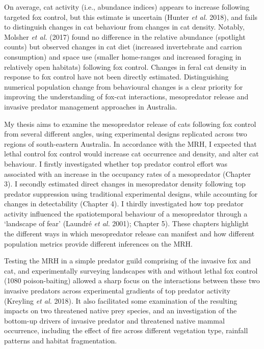 \documentclass[11pt,a4paper,titlepage,twoside,openright]{style/unimelbthesis}
\begin{document}
\begin{mainmatter}
On average, cat activity (i.e., abundance indices) appears to increase following targeted fox control, but this estimate is uncertain (Hunter \emph{et al.} 2018), and fails to distinguish changes in cat behaviour from changes in cat density. Notably, Molsher \emph{et al.} (2017) found no difference in the relative abundance (spotlight counts) but observed changes in cat diet (increased invertebrate and carrion consumption) and space use (smaller home-ranges and increased foraging in relatively open habitats) following fox control. Changes in feral cat density in response to fox control have not been directly estimated. Distinguishing numerical population change from behavioural changes is a clear priority for improving the understanding of fox-cat interactions, mesopredator release and invasive predator management approaches in Australia.

My thesis aims to examine the mesopredator release of cats following fox control from several different angles, using experimental designs replicated across two regions of south-eastern Australia. In accordance with the MRH, I expected that lethal control fox control would increase cat occurrence and density, and alter cat behaviour. I firstly investigated whether top predator control effort was associated with an increase in the occupancy rates of a mesopredator (Chapter 3). I secondly estimated direct changes in mesopredator density following top predator suppression using traditional experimental designs, while accounting for changes in detectability (Chapter 4). I thirdly investigated how top predator activity influenced the spatiotemporal behaviour of a mesopredator through a `landscape of fear' (Laundré \emph{et al.} 2001); Chapter 5). These chapters highlight the different ways in which mesopredator release can manifest and how different population metrics provide different inferences on the MRH.

Testing the MRH in a simple predator guild comprising of the invasive fox and cat, and experimentally surveying landscapes with and without lethal fox control (1080 poison-baiting) allowed a sharp focus on the interactions between these two invasive predators across experimental gradients of top predator activity (Kreyling \emph{et al.} 2018). It also facilitated some examination of the resulting impacts on two threatened native prey species, and an investigation of the bottom-up drivers of invasive predator and threatened native mammal occurrence, including the effect of fire across different vegetation type, rainfall patterns and habitat fragmentation.


\end{mainmatter}
\end{document}
